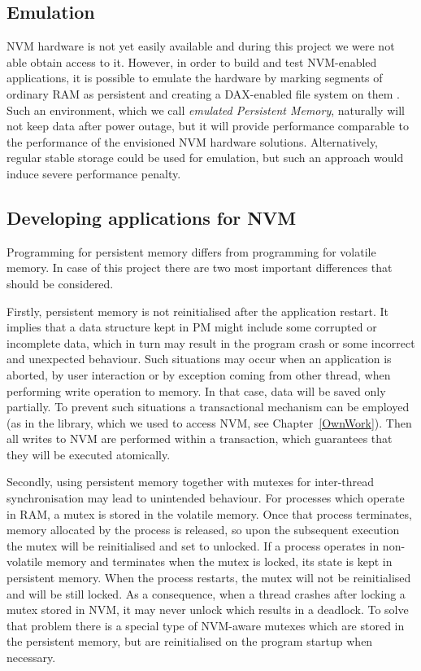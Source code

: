     \subsection{Emulation}
        NVM hardware is not yet easily available and during this project we were not able obtain access to it. However, in order to build and test NVM-enabled applications, it is possible to emulate the hardware by marking segments of ordinary RAM as persistent and creating a DAX-enabled file system on them \cite{PmemEmulation}.
        Such an environment, which we call \emph{emulated Persistent Memory}, naturally will not keep data after power outage, but it will provide performance comparable to the performance of the envisioned NVM hardware solutions. Alternatively, regular stable storage could be used for emulation, but such an approach would induce severe performance penalty. 
        
    \subsection{Developing applications for NVM}
        
        Programming for persistent memory differs from programming for volatile memory. 
        In case of this project there are two most important differences that should be considered.
        
        Firstly, persistent memory is not reinitialised after the application restart. It implies that a data structure kept in PM might include some corrupted or incomplete data, which in turn may result in the program crash or some incorrect and unexpected behaviour. Such situations may occur when an application is aborted, by user interaction or by exception coming from other thread, when performing write operation to memory. In that case, data will be saved only partially. To prevent such situations a transactional mechanism can be employed (as in the \libpmemobj library, which we used to access NVM, see Chapter~\ref{OwnWork}). Then all writes to NVM are performed within a transaction, which guarantees that they will be executed atomically.
        
        Secondly, using persistent memory together with mutexes for inter-thread synchronisation may lead to unintended behaviour. 
        For processes which operate in RAM, a mutex is stored in the volatile memory. Once that process terminates, memory allocated by the process is released, so upon the subsequent execution the mutex will be reinitialised and set to unlocked. If a process operates in non-volatile memory and terminates when the mutex is locked, its state is kept in persistent memory. When the process
        restarts, the mutex will not be reinitialised and will be still locked. As a consequence, when a thread crashes after locking a mutex stored in NVM, it may never unlock which results in a deadlock. To solve that problem there is a special type of NVM-aware mutexes which are stored in the persistent memory, but are reinitialised on the program startup when necessary. 
      
